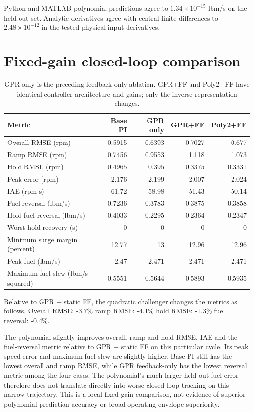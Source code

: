 \documentclass[11pt,a4paper]{article}
\begin{document}
Python and MATLAB polynomial predictions agree to $1.34\times10^{-15}$ lbm/s on the held-out set. Analytic derivatives agree with central finite differences to $2.48\times10^{-12}$ in the tested physical input derivatives.
\clearpage
\section{Fixed-gain closed-loop comparison}
\begin{table}[H]\centering\small\begin{tabular}{lrrrr}\toprule
Metric & Base PI & GPR only & GPR+FF & Poly2+FF\\\midrule
Overall RMSE (rpm) & 0.5915 & 0.6393 & 0.7027 & 0.677\\
Ramp RMSE (rpm) & 0.7456 & 0.9553 & 1.118 & 1.073\\
Hold RMSE (rpm) & 0.4965 & 0.395 & 0.3375 & 0.3331\\
Peak error (rpm) & 2.176 & 2.199 & 2.007 & 2.024\\
IAE (rpm s) & 61.72 & 58.98 & 51.43 & 50.14\\
Fuel reversal (lbm/s) & 0.7236 & 0.3783 & 0.3875 & 0.3858\\
Hold fuel reversal (lbm/s) & 0.4033 & 0.2295 & 0.2364 & 0.2347\\
Worst hold recovery (s) & 0 & 0 & 0 & 0\\
Minimum surge margin (percent) & 12.77 & 13 & 12.96 & 12.96\\
Peak fuel (lbm/s) & 2.47 & 2.471 & 2.471 & 2.471\\
Maximum fuel slew (lbm/s squared) & 0.5551 & 0.5644 & 0.5893 & 0.5935\\
\bottomrule\end{tabular}\caption{GPR only is the preceding feedback-only ablation. GPR+FF and Poly2+FF have identical controller architecture and gains; only the inverse representation changes.}\end{table}
Relative to GPR + static FF, the quadratic challenger changes the metrics as follows. Overall RMSE: -3.7\% ramp RMSE: -4.1\% hold RMSE: -1.3\% fuel reversal: -0.4\%.

The polynomial slightly improves overall, ramp and hold RMSE, IAE and the fuel-reversal metric relative to GPR + static FF on this particular cycle. Its peak speed error and maximum fuel slew are slightly higher. Base PI still has the lowest overall and ramp RMSE, while GPR feedback-only has the lowest reversal metric among the four cases. The polynomial's much larger held-out fuel error therefore does not translate directly into worse closed-loop tracking on this narrow trajectory. This is a local fixed-gain comparison, not evidence of superior polynomial prediction accuracy or broad operating-envelope superiority.
\end{document}
